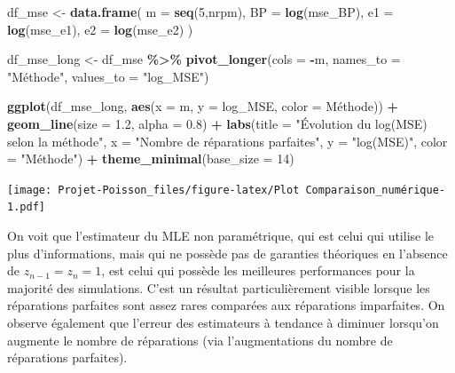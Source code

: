 \documentclass[
]{article}
\newenvironment{Shaded}{\begin{snugshade}}{\end{snugshade}}
\newcommand{\AttributeTok}[1]{\textcolor[rgb]{0.13,0.29,0.53}{#1}}
\newcommand{\DecValTok}[1]{\textcolor[rgb]{0.00,0.00,0.81}{#1}}
\newcommand{\FloatTok}[1]{\textcolor[rgb]{0.00,0.00,0.81}{#1}}
\newcommand{\FunctionTok}[1]{\textcolor[rgb]{0.13,0.29,0.53}{\textbf{#1}}}
\newcommand{\NormalTok}[1]{#1}
\newcommand{\OtherTok}[1]{\textcolor[rgb]{0.56,0.35,0.01}{#1}}
\newcommand{\SpecialCharTok}[1]{\textcolor[rgb]{0.81,0.36,0.00}{\textbf{#1}}}
\newcommand{\StringTok}[1]{\textcolor[rgb]{0.31,0.60,0.02}{#1}}
\begin{document}
\begin{Shaded}
\begin{Highlighting}[]
\NormalTok{df\_mse }\OtherTok{\textless{}{-}} \FunctionTok{data.frame}\NormalTok{(}
  \AttributeTok{m =} \FunctionTok{seq}\NormalTok{(}\DecValTok{5}\NormalTok{,nrpm),}
  \AttributeTok{BP =} \FunctionTok{log}\NormalTok{(mse\_BP),}
  \AttributeTok{e1 =} \FunctionTok{log}\NormalTok{(mse\_e1),}
  \AttributeTok{e2 =} \FunctionTok{log}\NormalTok{(mse\_e2)}
\NormalTok{)}

\NormalTok{df\_mse\_long }\OtherTok{\textless{}{-}}\NormalTok{ df\_mse }\SpecialCharTok{\%\textgreater{}\%}
  \FunctionTok{pivot\_longer}\NormalTok{(}\AttributeTok{cols =} \SpecialCharTok{{-}}\NormalTok{m, }\AttributeTok{names\_to =} \StringTok{"Méthode"}\NormalTok{, }\AttributeTok{values\_to =} \StringTok{"log\_MSE"}\NormalTok{)}

\FunctionTok{ggplot}\NormalTok{(df\_mse\_long, }\FunctionTok{aes}\NormalTok{(}\AttributeTok{x =}\NormalTok{ m, }\AttributeTok{y =}\NormalTok{ log\_MSE, }\AttributeTok{color =}\NormalTok{ Méthode)) }\SpecialCharTok{+}
  \FunctionTok{geom\_line}\NormalTok{(}\AttributeTok{size =} \FloatTok{1.2}\NormalTok{, }\AttributeTok{alpha =} \FloatTok{0.8}\NormalTok{) }\SpecialCharTok{+}
  \FunctionTok{labs}\NormalTok{(}\AttributeTok{title =} \StringTok{"Évolution du log(MSE) selon la méthode"}\NormalTok{,}
       \AttributeTok{x =} \StringTok{"Nombre de réparations parfaites"}\NormalTok{,}
       \AttributeTok{y =} \StringTok{"log(MSE)"}\NormalTok{,}
       \AttributeTok{color =} \StringTok{"Méthode"}\NormalTok{) }\SpecialCharTok{+}
  \FunctionTok{theme\_minimal}\NormalTok{(}\AttributeTok{base\_size =} \DecValTok{14}\NormalTok{)}
\end{Highlighting}
\end{Shaded}

\texttt{[image: Projet-Poisson\_files/figure-latex/Plot Comparaison\_numérique-1.pdf]}

On voit que l'estimateur du MLE non paramétrique, qui est celui qui
utilise le plus d'informations, mais qui ne possède pas de garanties
théoriques en l'absence de \(z_{n-1} = z_{n} = 1\), est celui qui
possède les meilleures performances pour la majorité des simulations.
C'est un résultat particulièrement visible lorsque les réparations
parfaites sont assez rares comparées aux réparations imparfaites. On
observe également que l'erreur des estimateurs à tendance à diminuer
lorsqu'on augmente le nombre de réparations (via l'augmentations du
nombre de réparations parfaites).
\end{document}
